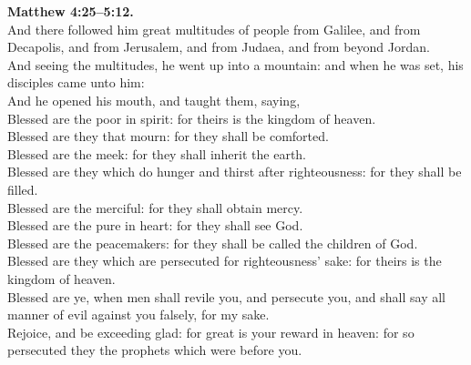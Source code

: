 \documentclass[10pt]{article} %
\begin{document}
{\begin{minipage}[t]{0.45\textwidth}
\textbf{Matthew 4:25--5:12.}\\
And there followed him great multitudes of people from Galilee, and from Decapolis, and from Jerusalem, and from Judaea, and from beyond Jordan.\\
And seeing the multitudes, he went up into a mountain: and when he was set, his disciples came unto him:\\
And he opened his mouth, and taught them, saying,\\
Blessed are the poor in spirit: for theirs is the kingdom of heaven.\\
Blessed are they that mourn: for they shall be comforted.\\
Blessed are the meek: for they shall inherit the earth.\\
Blessed are they which do hunger and thirst after righteousness: for they shall be filled.\\
Blessed are the merciful: for they shall obtain mercy.\\
Blessed are the pure in heart: for they shall see God.\\
Blessed are the peacemakers: for they shall be called the children of God.\\
Blessed are they which are persecuted for righteousness' sake: for theirs is the kingdom of heaven.\\
Blessed are ye, when men shall revile you, and persecute you, and shall say all manner of evil against you falsely, for my sake.\\
Rejoice, and be exceeding glad: for great is your reward in heaven: for so persecuted they the prophets which were before you.\\

\end{minipage}}
\vspace*{\fill}
\newpage
\Huge%
\vspace*{\fill}
\end{document}
